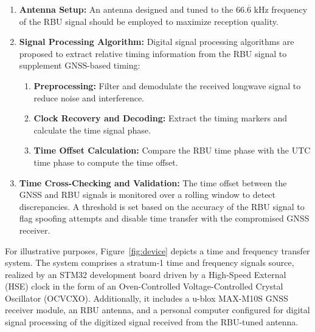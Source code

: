 \documentclass[12pt, a4paper]{extarticle}
\begin{document}
\begin{enumerate}[noitemsep]
    \item \textbf{Antenna Setup:}
        An antenna designed and tuned to the $66.\overline{6}$ kHz frequency of the RBU
        signal should be employed to maximize reception quality.

    \item \textbf{Signal Processing Algorithm:}
        Digital signal processing algorithms are proposed to extract
        relative timing information from the RBU signal to supplement GNSS-based
        timing:

    \begin{enumerate}[noitemsep]
        \item \textbf{Preprocessing:}
        Filter and demodulate the received longwave signal to reduce noise and interference.

        \item \textbf{Clock Recovery and Decoding:}
        Extract the timing markers and calculate the time signal phase.

        \item \textbf{Time Offset Calculation:}
        Compare the RBU time phase with the UTC time phase to compute the time offset.
    \end{enumerate}

    \item \textbf{Time Cross-Checking and Validation:}
        The time offset between the GNSS and RBU signals is monitored over
        a rolling window to detect discrepancies. A threshold is set
        based on the accuracy of the RBU signal to flag spoofing attempts
        and disable time transfer with the compromised GNSS receiver.
\end{enumerate}

For illustrative purposes, Figure~\ref{fig:device} depicts a time and frequency
transfer system. The system comprises a stratum-1 time and frequency signals
source, realized by an STM32 development board driven by a High-Speed External
(HSE) clock in the form of an Oven-Controlled Voltage-Controlled Crystal
Oscillator (OCVCXO). Additionally, it includes a u-blox MAX-M10S GNSS receiver
module, an RBU antenna, and a personal computer configured for digital signal
processing of the digitized signal received from the RBU-tuned antenna.
\end{document}
